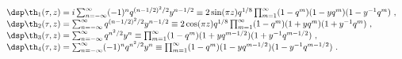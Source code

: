 \begin{equation}
 \begin{array}{l}
 \dsp \th_1(\tau,z) =i\sum_{n=-\infty}^{\infty}(-1)^n q^{(n-1/2)^2/2} y^{n-1/2}
  \equiv 2 \sin(\pi z)q^{1/8}\prod_{m=1}^{\infty}
    (1-q^m)(1-yq^m)(1-y^{-1}q^m)~, \\
 \dsp \th_2(\tau,z)=\sum_{n=-\infty}^{\infty} q^{(n-1/2)^2/2} y^{n-1/2}
  \equiv 2 \cos(\pi z)q^{1/8}\prod_{m=1}^{\infty}
    (1-q^m)(1+yq^m)(1+y^{-1}q^m)~, \\
 \dsp \th_3(\tau,z)=\sum_{n=-\infty}^{\infty} q^{n^2/2} y^{n}
  \equiv \prod_{m=1}^{\infty}
    (1-q^m)(1+yq^{m-1/2})(1+y^{-1}q^{m-1/2})~, \\
 \dsp \th_4(\tau,z)=\sum_{n=-\infty}^{\infty}(-1)^n q^{n^2/2} y^{n}
  \equiv \prod_{m=1}^{\infty}
    (1-q^m)(1-yq^{m-1/2})(1-y^{-1}q^{m-1/2})~.
 \end{array}
 \end{equation}

